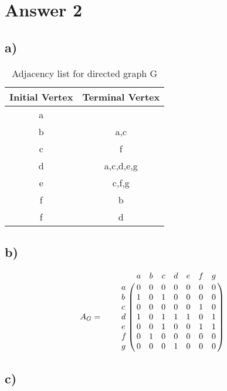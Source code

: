 \documentclass[11pt]{article}
\newcommand{\tikzmark}[1]{\tikz[overlay, remember picture] \coordinate (#1);}
\begin{document}
\section*{Answer 2}
\subsection*{a)}
\begin{table}[H]
\small
\centering
\caption{Adjacency list for directed graph G}  
\label{table:2}
\begin{tabular}{|c|c|}	%
\hline 							%
\textbf{Initial Vertex} & \textbf{Terminal Vertex} \\
\hline
\hline
a &  \\	
b & a,c\\
c & f \\
d & a,c,d,e,g\\
e &  c,f,g\\
f &  b\\
f & d \\
\hline 

\end{tabular}
\end{table}
\subsection*{b)}
\[
   A_G = \qquad \bordermatrix{~  & \tikzmark{harrowleft} a & b & c & d & e & f & g \tikzmark{harrowright}  \cr
                     \tikzmark{varrowtop}
                     a & 0 & 0 & 0 & 0 & 0 & 0 & 0\cr
                     b & 1 & 0 & 1 & 0 & 0 & 0 & 0\cr
                     c & 0 & 0 & 0 & 0 & 0 & 1 & 0\cr
                     d & 1 & 0 & 1 & 1 & 1 & 0 & 1\cr
                     e & 0 & 0 & 1 & 0 & 0 & 1 & 1\cr
                     f & 0 & 1 & 0 & 0 & 0 & 0 & 0\cr
                     \tikzmark{varrowbottom}
                     g & 0 & 0 & 0 & 1 & 0 & 0 & 0\cr
                     }
\]
\subsection*{c)}
\\
\\
\\
\\
\\
\\
\\
\end{document}
